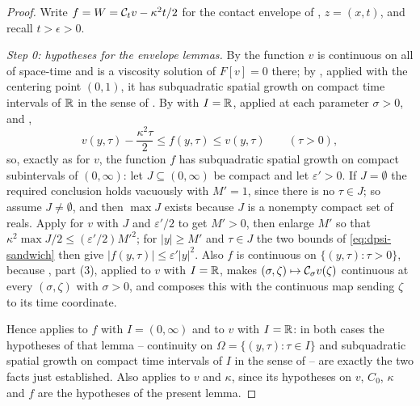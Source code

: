 \begin{proof}
Write $f=W=\mathcal{C}_tv-\kappa^2t/2$ for the contact envelope of
, $z=(x,t)$, and recall $t>\epsilon>0$.

\emph{Step 0: hypotheses for the envelope lemmas.}
By  the function $v$ is continuous on all of space-time and
is a viscosity solution of $F[v]=0$ there; by
, applied with the centering point $(0,1)$, it has
subquadratic spatial growth on compact time intervals of $\mathbb{R}$ in the sense of
. By  with $I=\mathbb{R}$, applied
at each parameter $\sigma>0$, and ,
\begin{equation}\label{eq:dpsi-sandwich}
  v(y,\tau)-\frac{\kappa^2\tau}{2}\le f(y,\tau)\le v(y,\tau)\qquad(\tau>0),
\end{equation}
so, exactly as for $v$, the function $f$ has subquadratic spatial growth on
compact subintervals of $(0,\infty)$: let $J\subseteq(0,\infty)$ be compact and
let $\varepsilon'>0$. If $J=\emptyset$ the required conclusion holds vacuously
with $M'=1$, since there is no $\tau\in J$; so assume $J\ne\emptyset$, and then
$\max J$ exists because $J$ is a nonempty compact set of reals. Apply
 for $v$ with $J$ and $\varepsilon'/2$ to get
$M'>0$, then enlarge $M'$ so that
$\kappa^2\max J/2\le(\varepsilon'/2)M'^2$; for $|y|\ge M'$ and $\tau\in J$ the
two bounds of \eqref{eq:dpsi-sandwich} then give
$|f(y,\tau)|\le\varepsilon'|y|^2$. Also $f$ is continuous on
$\{(y,\tau):\tau>0\}$, because , part (3), applied to
$v$ with $I=\mathbb{R}$, makes $(\sigma,\zeta)\mapsto\mathcal{C}_\sigma v(\zeta)$ continuous at
every $(\sigma,\zeta)$ with $\sigma>0$, and  composes this
with the continuous map sending $\zeta$ to its time coordinate.

Hence  applies to $f$ with $I=(0,\infty)$ and to $v$
with $I=\mathbb{R}$: in both cases the hypotheses of that lemma -- continuity on
$\Omega=\{(y,\tau):\tau\in I\}$ and subquadratic spatial growth on compact time
intervals of $I$ in the sense of  -- are exactly the
two facts just established. Also  applies to $v$
and $\kappa$, since its hypotheses on $v$, $C_0$, $\kappa$ and $f$ are the
hypotheses of the present lemma.


\end{proof}
